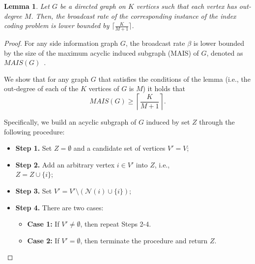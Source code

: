 \documentclass[letterpaper, 10 pt, conference]{ieeeconf}
\newtheorem{lemma}{Lemma}
\begin{document}
\begin{lemma}
\label{lem:mais-lower-bound}
Let  $G$ be a directed graph on $K$ vertices such that each vertex has out-degree $M$. Then, the broadcast rate of the corresponding instance of the index coding problem is lower bounded by $\lceil \frac{K}{M+1} \rceil$.
\end{lemma}
\begin{proof}
For any side information graph $G$, the broadcast rate $\beta$ is lower bounded by the size of the maximum acyclic induced subgraph (MAIS) of $G$, denoted as $MAIS(G)$~\cite{Alon:FOCS:08,Arbabjolfae:17}.

We show that for any graph $G$ that satisfies the conditions of the lemma (i.e., the out-degree of each of the $K$ vertices of $G$ is $M$) it holds that 
$$MAIS(G)\geq \left\lceil \frac{K}{M+1} \right\rceil.$$


Specifically, we build an acyclic subgraph of $G$ induced by set $Z$ through the following procedure:


\begin{itemize}
	\item[] \hspace{-0.5cm} \textbf{Step 1.} Set $Z = \emptyset$ and  a  candidate set of vertices $V'=V$;
	\item[] \hspace{-0.5cm} \textbf{Step 2.} Add an arbitrary vertex $i\in V'$ into $Z$, i.e.,\\
$Z = Z \cup \{i\}$;
	\item[] \hspace{-0.5cm} \textbf{Step 3.} Set $V' = V' \setminus (\mathcal{N}(i) \cup \{i\})$;
	\item[] \hspace{-0.5cm} \textbf{Step 4.} There are two cases:
	\begin{itemize}
		\item[] \hspace{-0.5cm}\textbf{Case 1:} If $V' \neq \emptyset$, then repeat Steps 2-4.
		\item[] \hspace{-0.5cm}\textbf{Case 2:} If $V' = \emptyset$, then terminate the procedure and return $Z$.
	\end{itemize}
\end{itemize}


\end{proof}
\end{document}
